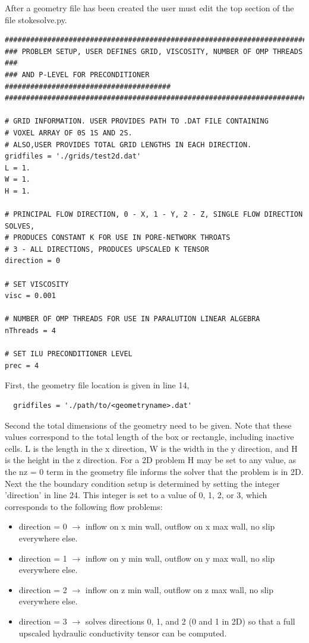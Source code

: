 \documentclass{report}
\begin{document}
After a geometry file has been created the user must
edit the top section of the file stokesolve.py.
\begin{lstlisting}
##########################################################################
### PROBLEM SETUP, USER DEFINES GRID, VISCOSITY, NUMBER OF OMP THREADS ###
### AND P-LEVEL FOR PRECONDITIONER #######################################
##########################################################################

# GRID INFORMATION. USER PROVIDES PATH TO .DAT FILE CONTAINING
# VOXEL ARRAY OF 0S 1S AND 2S.
# ALSO,USER PROVIDES TOTAL GRID LENGTHS IN EACH DIRECTION.
gridfiles = './grids/test2d.dat'
L = 1.
W = 1.
H = 1.

# PRINCIPAL FLOW DIRECTION, 0 - X, 1 - Y, 2 - Z, SINGLE FLOW DIRECTION SOLVES,
# PRODUCES CONSTANT K FOR USE IN PORE-NETWORK THROATS
# 3 - ALL DIRECTIONS, PRODUCES UPSCALED K TENSOR
direction = 0

# SET VISCOSITY
visc = 0.001

# NUMBER OF OMP THREADS FOR USE IN PARALUTION LINEAR ALGEBRA
nThreads = 4

# SET ILU PRECONDITIONER LEVEL
prec = 4

\end{lstlisting}

\noindent First, the geometry file location is given in line 14,
\begin{lstlisting}
  gridfiles = './path/to/<geometryname>.dat'
\end{lstlisting}

\noindent Second the total dimensions of the geometry need to be given. Note
that these values correspond to the total length of the box or rectangle, including
inactive cells. L is the length in the x direction, W is the width in the y
direction, and H is the height in the z direction. For a 2D problem H
may be set to any value, as the nz = 0 term in the geometry file informs
the solver that the problem is in 2D.\\

\noindent Next the the boundary condition setup is determined by setting
the integer 'direction' in line 24. This integer is set to a value
of 0, 1, 2, or 3, which corresponds to the following flow problems:
\begin{itemize}
  \item direction = 0 $\rightarrow$ inflow on x min wall, outflow on x max wall,
        no slip everywhere else.
  \item direction = 1 $\rightarrow$ inflow on y min wall, outflow on y max wall,
        no slip everywhere else.
  \item direction = 2 $\rightarrow$ inflow on z min wall, outflow on z max wall,
        no slip everywhere else.
  \item direction = 3 $\rightarrow$ solves directions 0, 1, and 2 (0 and 1 in 2D)
        so that a full upscaled hydraulic conductivity tensor can be computed.
\end{itemize}
\end{document}
